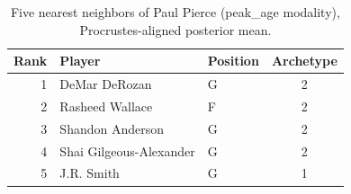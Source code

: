 \begin{table}[htbp]
  \centering\small
  \begin{tabular}{rllc}
    \toprule
    Rank & Player & Position & Archetype \\
    \midrule
    1 & DeMar DeRozan & G & 2 \\
    2 & Rasheed Wallace & F & 2 \\
    3 & Shandon Anderson & G & 2 \\
    4 & Shai Gilgeous-Alexander & G & 2 \\
    5 & J.R. Smith & G & 1 \\
    \bottomrule
  \end{tabular}
  \caption{Five nearest neighbors of Paul Pierce (peak_age modality), Procrustes-aligned posterior mean.}
  \label{tab:Paul_Pierce_neighbors_peak_age}
\end{table}

